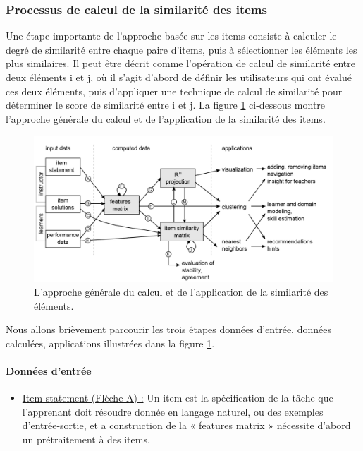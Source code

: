 \subsubsection{Processus de calcul de la similarité des items}
Une étape importante de l'approche basée sur les items consiste à calculer le degré de similarité entre chaque paire d’items, puis à sélectionner les éléments les plus similaires. Il peut être décrit comme l'opération de calcul de similarité entre deux éléments i et j, où il s'agit d'abord de définir les utilisateurs qui ont évalué ces deux éléments, puis d'appliquer une technique de calcul de similarité pour déterminer le score de similarité entre i et j. \cite{item_based_recommendation_algo} La figure \ref{calcul_application_similarity} ci-dessous montre l'approche générale du calcul et de l'application de la similarité des items.

\begin{figure}[H]
	\begin{center}
		\includegraphics[width=\textwidth]{images/chapitre3/calcul_application_similarity.png}
	\end{center}
\caption{L'approche générale du calcul et de l'application de la similarité des éléments.}
\label{calcul_application_similarity}
\end{figure}

Nous allons brièvement parcourir les trois étapes données d'entrée, données calculées, applications illustrées dans la figure \ref{calcul_application_similarity}. 
\paragraph{Données d'entrée \\}

\begin{itemize}
    \item \underline{Item statement (Flèche A) :} Un item est la spécification de la tâche que l’apprenant doit résoudre donnée en langage naturel, ou des exemples d’entrée-sortie, et a construction de la « features matrix » nécessite d’abord un prétraitement à des items.
\end{itemize}


